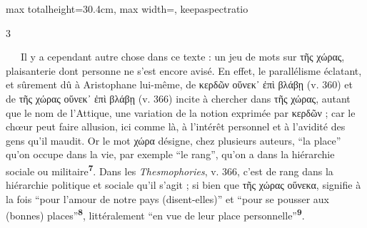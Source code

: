 \documentclass[11pt,twoside]{book}
\newcommand{\italique}[1]{\textit{#1}}
\newcommand{\marqueur}[1]{\textsuperscript{\color{rubricRed}\textbf{#1}}}
\begin{document}
\begin{adjustbox}{max totalheight=30.4cm, max width=\textwidth, keepaspectratio}
\begin{minipage}{\textwidth}
{\begin{multicols}{3}
\par\vspace{1.5pt}
\noindent\textbf{} \textbf{} \ \ \ Il y a cependant autre chose dans ce texte : un jeu de mots sur τῆς χώρας, plaisanterie dont personne ne s'est encore avisé. En effet, le parallélisme éclatant, et sûrement dû à Aristophane lui-même, de κερδῶν οὕνεκ᾽ ἐπὶ βλάβῃ (v. 360) et de τῆς χώρας οὕνεκ᾽ ἐπὶ βλάβῃ (v. 366) incite à chercher dans τῆς χώρας, autant que le nom de l'Attique, une variation de la notion exprimée par κερδῶν ; car le chœur peut faire allusion, ici comme là, à l'intérêt personnel et à l'avidité des gens qu'il maudit. Or le mot χώρα désigne, chez plusieurs auteurs, “la place” qu'on occupe dans la vie, par exemple “le rang”, qu'on a dans la hiérarchie sociale ou militaire\marqueur{7}. Dans les \italique{Thesmophories}, v. 366, c'est de rang dans la hiérarchie politique et sociale qu'il s'agit ; si bien que τῆς χώρας οὕνεκα, signifie à la fois “pour l'amour de notre pays (disent-elles)” et “pour se pousser aux (bonnes) places”\marqueur{8}, littéralement “en vue de leur place personnelle”\marqueur{9}.
\par\end{multicols}}
\end{minipage}\end{adjustbox}
\newpage
\end{document}
